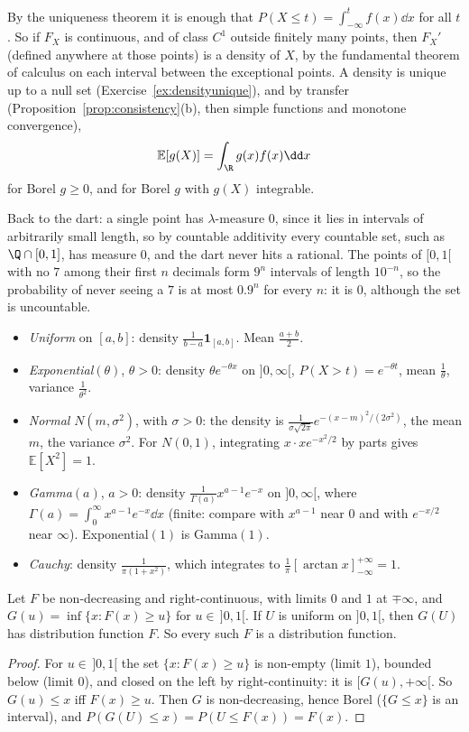 By the uniqueness theorem it is enough that $P(X\le t)=\int_{-\infty}^tf(x)\dd x$ for all $t$. So if $F_X$ is continuous, and of class $C^1$ outside
finitely many points, then $F_X'$ (defined anywhere at those points) is a density of $X$, by the fundamental theorem of
calculus on each interval between the exceptional points. A density is unique up to a null set (Exercise~\ref{ex:densityunique}),
and by transfer (Proposition~\ref{prop:consistency}(b), then simple functions and monotone convergence),
\[
\mathbb E[g(X)]=\int_\R g(x)f(x)\dd x
\]
for Borel $g\ge0$, and for Borel $g$ with $g(X)$ integrable.

Back to the dart: a single point has $\lambda$-measure $0$, since it lies in intervals of arbitrarily small length, so by countable
additivity every countable set, such as $\Q\cap[0,1]$, has measure $0$, and the dart never hits a rational. The points of $[0,1[$
with no $7$ among their first $n$ decimals form $9^n$ intervals of length $10^{-n}$, so the probability of never seeing a $7$ is at most
$0.9^n$ for every $n$: it is $0$, although the set is uncountable.

\begin{example}\label{ex:laws}
\begin{itemize}
\item \emph{Uniform} on $[a,b]$: density $\frac1{b-a}\mathbf 1_{[a,b]}$. Mean $\frac{a+b}2$.
\item \emph{Exponential}$(\theta)$, $\theta>0$: density $\theta e^{-\theta x}$ on $]0,\infty[$, $P(X>t)=e^{-\theta t}$, mean $\frac1\theta$, variance $\frac1{\theta^2}$.
\item \emph{Normal} $N(m,\sigma^2)$, with $\sigma>0$: the density is $\frac1{\sigma\sqrt{2\pi}}e^{-(x-m)^2/(2\sigma^2)}$, the mean $m$, the variance $\sigma^2$. For $N(0,1)$, integrating $x\cdot xe^{-x^2/2}$ by parts
gives $\mathbb E[X^2]=1$.
\item \emph{Gamma}$(a)$, $a>0$: density $\frac1{\Gamma(a)}x^{a-1}e^{-x}$ on $]0,\infty[$, where $\Gamma(a)=\int_0^\infty x^{a-1}e^{-x}\dd x$ (finite: compare with
$x^{a-1}$ near $0$ and with $e^{-x/2}$ near $\infty$). Exponential$(1)$ is Gamma$(1)$.
\item \emph{Cauchy}: density $\frac1{\pi(1+x^2)}$, which integrates to $\frac1\pi[\arctan x]_{-\infty}^{+\infty}=1$.
\end{itemize}
\end{example}

\begin{proposition}\label{prop:inverse}
Let $F$ be non-decreasing and right-continuous, with limits $0$ and $1$ at $\mp\infty$, and $G(u)=\inf\{x:F(x)\ge u\}$ for $u\in\,]0,1[$. If $U$ is
uniform on $]0,1[$, then $G(U)$ has distribution function $F$. So every such $F$ is a distribution function.
\end{proposition}
\begin{proof}
For $u\in\,]0,1[$ the set $\{x:F(x)\ge u\}$ is non-empty (limit $1$), bounded below (limit $0$), and closed on the left by right-continuity:
it is $[G(u),+\infty[$. So $G(u)\le x$ iff $F(x)\ge u$. Then $G$ is non-decreasing, hence Borel ($\{G\le x\}$ is an interval), and
$P(G(U)\le x)=P(U\le F(x))=F(x)$.
\end{proof}

